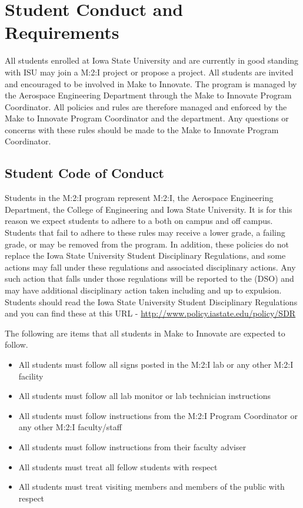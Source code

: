 

\chapter{Student Conduct and Requirements}

All students enrolled at Iowa State University and are currently in good standing with ISU may join a M:2:I project or propose a project.  All students are invited and encouraged to be involved in Make to Innovate.  The program is managed by the Aerospace Engineering Department through the Make to Innovate Program Coordinator.  All policies and rules are therefore managed and enforced by the Make to Innovate Program Coordinator and the department.  Any questions or concerns with these rules should be made to the Make to Innovate Program Coordinator.  

\section{Student Code of Conduct}
Students in the M:2:I program represent M:2:I, the Aerospace Engineering Department, the College of Engineering and Iowa State University.  It is for this reason we expect students to adhere to a  both on campus and off campus.  Students that fail to adhere to these rules may receive a lower grade, a failing grade, or may be removed from the program.  In addition, these policies do not replace the Iowa State University Student Disciplinary Regulations, and some actions may fall under these regulations and associated disciplinary actions.  Any such action that falls under those regulations will be reported to the  (DSO) and may have additional disciplinary action taken including and up to expulsion.  Students should read the Iowa State University Student Disciplinary Regulations and you can find these at this URL - \url{http://www.policy.iastate.edu/policy/SDR}  

The following are items that all students in Make to Innovate are expected to follow.

\begin{itemize}
\item All students must follow all signs posted in the M:2:I lab or any other M:2:I facility
\item All students must follow all lab monitor or lab technician instructions
\item All students must follow instructions from the M:2:I Program Coordinator or any other M:2:I faculty/staff
\item All students must follow instructions from their faculty adviser
\item All students must treat all fellow students with respect
\item All students must treat visiting members and members of the public with respect
\end{itemize}

